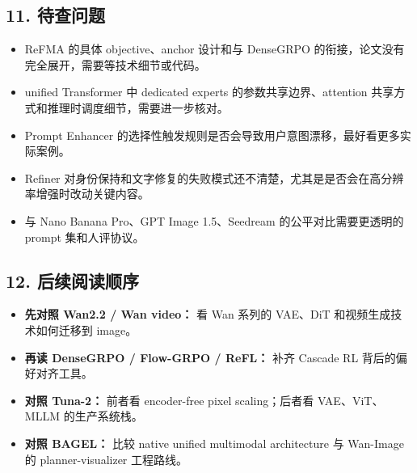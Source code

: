 \subsection{11. 待查问题}

\begin{itemize}[leftmargin=1.5em]
  \item ReFMA 的具体 objective、anchor 设计和与 DenseGRPO 的衔接，论文没有完全展开，需要等技术细节或代码。
  \item unified Transformer 中 dedicated experts 的参数共享边界、attention 共享方式和推理时调度细节，需要进一步核对。
  \item Prompt Enhancer 的选择性触发规则是否会导致用户意图漂移，最好看更多实际案例。
  \item Refiner 对身份保持和文字修复的失败模式还不清楚，尤其是是否会在高分辨率增强时改动关键内容。
  \item 与 Nano Banana Pro、GPT Image 1.5、Seedream 的公平对比需要更透明的 prompt 集和人评协议。
\end{itemize}

\subsection{12. 后续阅读顺序}

\begin{itemize}[leftmargin=1.5em]
  \item \textbf{先对照 Wan2.2 / Wan video：} 看 Wan 系列的 VAE、DiT 和视频生成技术如何迁移到 image。
  \item \textbf{再读 DenseGRPO / Flow-GRPO / ReFL：} 补齐 Cascade RL 背后的偏好对齐工具。
  \item \textbf{对照 Tuna-2：} 前者看 encoder-free pixel scaling；后者看 VAE、ViT、MLLM 的生产系统栈。
  \item \textbf{对照 BAGEL：} 比较 native unified multimodal architecture 与 Wan-Image 的 planner-visualizer 工程路线。
\end{itemize}
